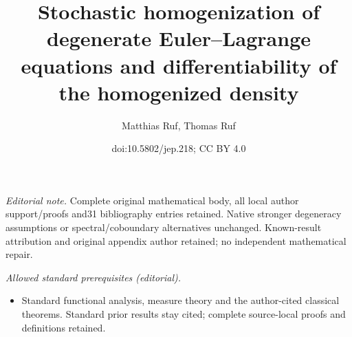 \documentclass[10pt]{amsart}
\title{Stochastic homogenization of degenerate Euler–Lagrange equations and differentiability of the homogenized density}
\author{Matthias Ruf, Thomas Ruf}
\date{doi:10.5802/jep.218; CC BY 4.0}
\theoremstyle{definition}
\begin{document}
\maketitle
\noindent\textit{Editorial note.} Complete original mathematical body, all local author support/proofs and31 bibliography entries retained. Native stronger degeneracy assumptions or spectral/coboundary alternatives unchanged. Known-result attribution and original appendix author retained; no independent mathematical repair.\par\medskip
\noindent\textit{Allowed standard prerequisites (editorial).}\begin{itemize}
\item Standard functional analysis, measure theory and the author-cited classical theorems. Standard prior results stay cited; complete source-local proofs and definitions retained.
\end{itemize}\medskip
\vspace*{-\baselineskip}
\tableofcontents
\end{document}
